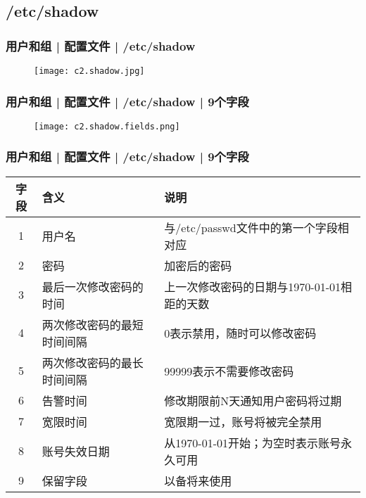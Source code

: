 \subsection{/etc/shadow}
\begin{frame}
  \frametitle{用户和组 | 配置文件 | /etc/shadow}
  \begin{figure}
    \centering
    \texttt{[image: c2.shadow.jpg]}
  \end{figure}
\end{frame}

\begin{frame}
  \frametitle{用户和组 | 配置文件 | /etc/shadow | 9个字段}
  \begin{figure}
    \centering
    \texttt{[image: c2.shadow.fields.png]}
  \end{figure}
\end{frame}

\begin{frame}
  \frametitle{用户和组 | 配置文件 | /etc/shadow | 9个字段}
  \begin{table}
    \centering
    \begin{tabularx}{\textwidth}{clX}
      \hline
      \rowcolor{blue!50}字段 & 含义 & 说明\\
      \hline
      1 & 用户名 & 与/etc/passwd文件中的第一个字段相对应\\
      2 & 密码 & 加密后的密码\\
      3 & 最后一次修改密码的时间 & 上一次修改密码的日期与1970-01-01相距的天数\\
      4 & 两次修改密码的最短时间间隔 & 0表示禁用，随时可以修改密码\\
      5 & 两次修改密码的最长时间间隔 & 99999表示不需要修改密码\\
      6 & 告警时间 & 修改期限前N天通知用户密码将过期\\
      7 & 宽限时间 & 宽限期一过，账号将被完全禁用\\
      8 & 账号失效日期 & 从1970-01-01开始；为空时表示账号永久可用\\
      9 & 保留字段 & 以备将来使用\\
      \hline
    \end{tabularx}
  \end{table}
\end{frame}

